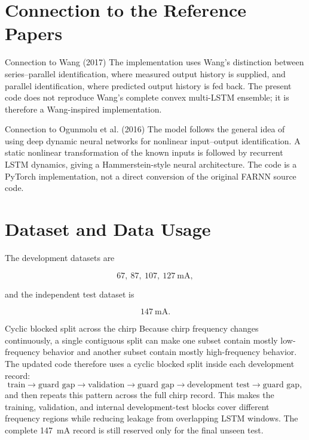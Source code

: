 \documentclass[11pt]{article}
\begin{document}
\section{Connection to the Reference Papers}

\begin{paperbox}{Connection to Wang (2017)}
The implementation uses Wang's distinction between series--parallel
identification, where measured output history is supplied, and parallel
identification, where predicted output history is fed back. The present code
does not reproduce Wang's complete convex multi-LSTM ensemble; it is therefore
a Wang-inspired implementation.
\end{paperbox}

\begin{paperbox}{Connection to Ogunmolu et al. (2016)}
The model follows the general idea of using deep dynamic neural networks for
nonlinear input--output identification. A static nonlinear transformation of
the known inputs is followed by recurrent LSTM dynamics, giving a
Hammerstein-style neural architecture. The code is a PyTorch implementation,
not a direct conversion of the original FARNN source code.
\end{paperbox}

\section{Dataset and Data Usage}

The development datasets are

\[
67,\ 87,\ 107,\ 127~\mathrm{mA},
\]

and the independent test dataset is

\[
147~\mathrm{mA}.
\]

\begin{databox}{Cyclic blocked split across the chirp}
Because chirp frequency changes continuously, a single contiguous split can
make one subset contain mostly low-frequency behavior and another subset
contain mostly high-frequency behavior. The updated code therefore uses a
cyclic blocked split inside each development record:
\[
\text{train}\rightarrow\text{guard gap}\rightarrow
\text{validation}\rightarrow\text{guard gap}\rightarrow
\text{development test}\rightarrow\text{guard gap},
\]
and then repeats this pattern across the full chirp record. This makes the
training, validation, and internal development-test blocks cover different
frequency regions while reducing leakage from overlapping LSTM windows.
The complete 147~mA record is still reserved only for the final unseen test.
\end{databox}
\end{document}
